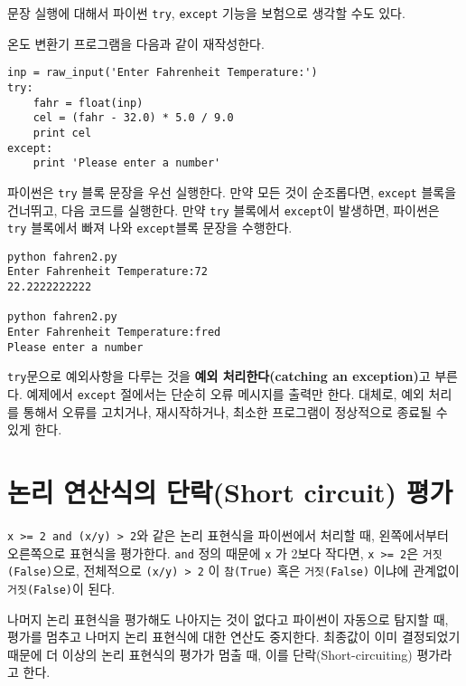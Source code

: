 문장 실행에 대해서 파이썬 {\tt try}, {\tt except} 기능을 보험으로 생각할 수도 있다.

온도 변환기 프로그램을 다음과 같이 재작성한다.

\beforeverb
\begin{verbatim}
inp = raw_input('Enter Fahrenheit Temperature:')
try:
    fahr = float(inp)
    cel = (fahr - 32.0) * 5.0 / 9.0
    print cel
except:
    print 'Please enter a number'
\end{verbatim}
\afterverb
%

파이썬은 {\tt try} 블록 문장을 우선 실행한다. 
만약 모든 것이 순조롭다면, {\tt except} 블록을 건너뛰고, 다음 코드를 실행한다.
만약 {\tt try} 블록에서 {\tt except}이 발생하면, 
파이썬은 {\tt try} 블록에서 빠져 나와 {\tt except}블록 문장을 수행한다.

\beforeverb
\begin{verbatim}
python fahren2.py 
Enter Fahrenheit Temperature:72
22.2222222222

python fahren2.py 
Enter Fahrenheit Temperature:fred
Please enter a number
\end{verbatim}
\afterverb
%

{\tt try}문으로 예외사항을 다루는 것을 {\bf 예외 처리한다(catching an exception)}고 부른다.
예제에서 {\tt except} 절에서는 단순히 오류 메시지를 출력만 한다. 
대체로, 예외 처리를 통해서 오류를 고치거나, 재시작하거나, 최소한 프로그램이 정상적으로 종료될 수 있게 한다.

\section{논리 연산식의 단락(Short circuit) 평가}

{\tt x >= 2 and (x/y) > 2}와 같은 논리 표현식을 파이썬에서 처리할 때, 왼쪽에서부터 오른쪽으로 표현식을 평가한다.
{\tt and} 정의 때문에 {\tt x} 가 2보다 작다면, {\tt x >= 2}은 {\tt 거짓(False)}으로, 
전체적으로 {\tt (x/y) > 2} 이 {\tt 참(True)} 혹은 {\tt 거짓(False)} 이냐에 관계없이 {\tt 거짓(False)}이 된다. 

나머지 논리 표현식을 평가해도 나아지는 것이 없다고 파이썬이 자동으로 탐지할 때,
평가를 멈추고 나머지 논리 표현식에 대한 연산도 중지한다. 
최종값이 이미 결정되었기 때문에 더 이상의 논리 표현식의 평가가 멈출 때, 이를 단락(Short-circuiting) 평가라고 한다.


